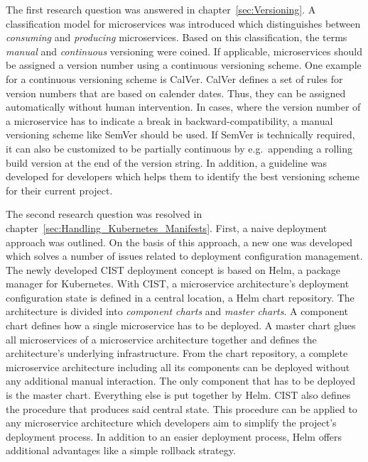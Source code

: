 The first research question was answered in chapter~\ref{sec:Versioning}. A
classification model for microservices was introduced which distinguishes
between \textit{consuming} and \textit{producing} microservices. Based on this
classification, the terms \textit{manual} and \textit{continuous} versioning
were coined. If applicable, microservices should be assigned a version number
using a continuous versioning scheme. One example for a continuous versioning
scheme is CalVer. CalVer defines a set of rules for version numbers that are
based on calender dates. Thus, they can be assigned automatically without human
intervention. In cases, where the version number of a microservice has to
indicate a break in backward-compatibility, a manual versioning scheme like
SemVer should be used. If SemVer is technically required, it can also be
customized to be partially continuous by e.g.\ appending a rolling build
version at the end of the version string. In addition, a guideline was
developed for developers which helps them to identify the best versioning
scheme for their current project.

The second research question was resolved in
chapter~\ref{sec:Handling_Kubernetes_Manifests}. First, a naive deployment
approach was outlined. On the basis of this approach, a new one was developed
which solves a number of issues related to deployment configuration management.
The newly developed \ac{CIST} deployment concept is based on Helm, a package
manager for Kubernetes. With \ac{CIST}, a microservice architecture's
deployment configuration state is defined in a central location, a Helm chart
repository. The architecture is divided into \textit{component charts} and
\textit{master charts}. A component chart defines how a single microservice has
to be deployed. A master chart glues all microservices of a microservice
architecture together and defines the architecture's underlying infrastructure.
From the chart repository, a complete microservice architecture including all
its components can be deployed without any additional manual interaction. The
only component that has to be deployed is the master chart. Everything else is
put together by Helm. \ac{CIST} also defines the procedure that produces said
central state. This procedure can be applied to any microservice architecture
which developers aim to simplify the project's deployment process. In addition
to an easier deployment process, Helm offers additional advantages like a
simple rollback strategy.

